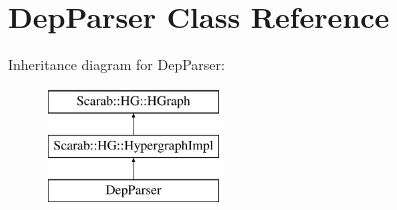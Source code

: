 \hypertarget{classDepParser}{
\section{DepParser Class Reference}
\label{classDepParser}
}
Inheritance diagram for DepParser:\begin{figure}[H]
\begin{center}
\leavevmode
\includegraphics[height=3cm]{classDepParser}
\end{center}
\end{figure}
